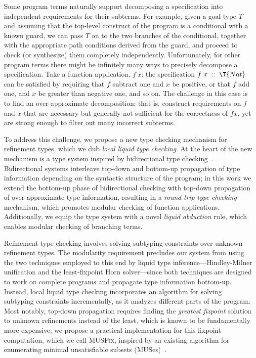 \documentclass[10pt,preprint]{sigplanconf-pldi16}
\theoremstyle{definition}
\newcommand{\HasT}{\;\mathrel{\mathrm{::}}\;}
\newcommand{\App}[2]{{#1}\ {#2}}
\begin{document}
Some program terms naturally support decomposing a specification into independent requirements for their subterms.
For example, 
given a goal type $T$ and assuming that the top-level construct of the program is a conditional with a known guard,
we can pass $T$ on to the two branches of the conditional, together with the appropriate path conditions derived from the guard,
and proceed to check (or synthesize) them completely independently.
Unfortunately, for other program terms there might be infinitely many ways to precisely decompose a specification.
Take a function application, $\App{f}{x}$:
the specification $\App{f}{x}\HasT\T{Nat}$
can be satisfied by requiring that $f$ subtract one and $x$ be positive,
or that $f$ add one, and $x$ be greater than negative one, and so on.
The challenge in this case is to find an over-approximate decomposition:
that is, construct requirements on $f$ and $x$ that are necessary but generally not sufficient for the correctness of $f x$,
yet are strong enough to filter out many incorrect subterms.

To address this challenge, we propose a new type checking mechanism for refinement types, 
which we dub \emph{local liquid type checking}.
At the heart of the new mechanism is a type system
inspired by bidirectional type checking~\cite{PierceTu00}.
Bidirectional systems interleave top-down and bottom-up propagation of type information 
depending on the syntactic structure of the program;
in this work we extend the bottom-up phase of bidirectional checking with top-down propagation of over-approximate type information,
resulting in a \emph{round-trip type checking} mechanism, which promotes modular checking of function applications. 
Additionally, we equip the type system with a novel \emph{liquid abduction} rule,
which enables modular checking of branching terms.

Refinement type checking involves
solving subtyping constraints over unknown refinement types.
The modularity requirement precludes our system from using the two techniques employed to this end by liquid type inference---Hindley-Milner unification and the least-fixpoint Horn solver---since both techniques are designed to work on complete programs and propagate type information bottom-up.
Instead, local liquid type checking incorporates an algorithm for solving subtyping constraints incrementally, as it analyzes different parts of the program.
Most notably, top-down propagation requires finding the \emph{greatest fixpoint} solution to unknown refinements instead of the least,
which is known to be fundamentally more expensive;
we propose a practical implementation for this fixpoint computation, 
which we call \textsc{MUSFix},
inspired by an existing algorithm for enumerating minimal unsatisfiable subsets (MUSes)~\cite{LiffitonPrMaMa15}.
\end{document}
